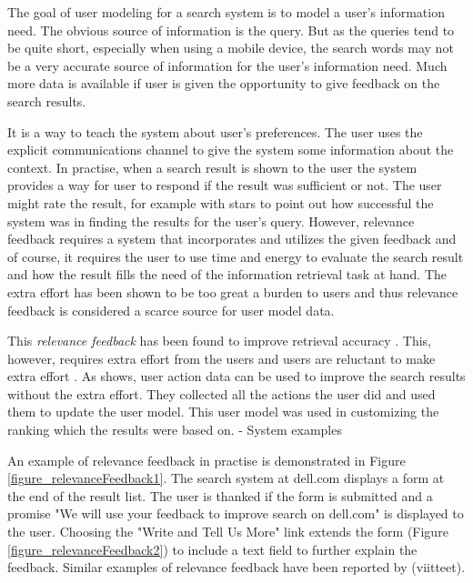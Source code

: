 \documentclass{sigchi}
\begin{document}
The goal of user modeling for a search system is to model a user's information need. The obvious source of information is the query. But as the queries tend to be quite short, especially when using a mobile device, the search words may not be a very accurate source of information for the user's information need. Much more data is available if user is given the opportunity to give feedback on the search results. 

It is a way to teach the system about user’s preferences. The user uses the explicit communications channel to give the system some information about the context. In practise, when a search result is shown to the user the system provides a way for user to respond if the result was sufficient or not. The user might rate the result, for example with stars to point out how successful the system was in finding the results for the user’s query. However, relevance feedback requires a system that incorporates and utilizes the given feedback and of course, it requires the user to use time and energy to evaluate the search result and how the result fills the need of the information retrieval task at hand. The extra effort has been shown to be too great a burden to users and thus relevance feedback is considered a scarce source for user model data.

This \emph{relevance feedback} has been found to improve retrieval accuracy \cite{salton90}. This, however, requires extra effort from the users and users are reluctant to make extra effort \cite{kelly03}. As \cite{shen05} shows, user action data can be used to improve the search results without the extra effort. They collected all the actions the user did and used them to update the user model. This user model was used in customizing the ranking which the results were based on.
- System examples

An example of relevance feedback in practise is demonstrated in Figure \ref{figure_relevanceFeedback1}. The search system at dell.com displays a form at the end of the result list. The user is thanked if the form is submitted and a promise "We will use your feedback to improve search on dell.com" is displayed to the user. Choosing the "Write and Tell Us More" link extends the form (Figure \ref{figure_relevanceFeedback2}) to include a text field to further explain the feedback. Similar examples of relevance feedback have been reported by (viitteet).
\end{document}

